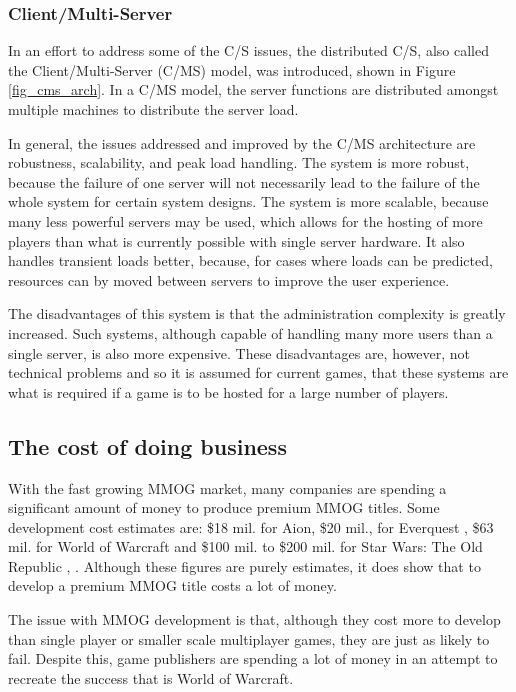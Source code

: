 \subsubsection{Client/Multi-Server}

In an effort to address some of the C/S issues, the distributed C/S, also called the Client/Multi-Server (C/MS) model, was introduced, shown in Figure \ref{fig_cms_arch}. In a C/MS model,
the server functions are distributed amongst multiple machines to distribute the server load.

In general, the issues addressed and improved by the C/MS architecture are robustness, scalability, and peak load handling. The system is more robust, because the failure of one server will not necessarily lead to the failure of the whole system for certain system designs. The system is more scalable, because many less powerful servers may be used, which allows for the hosting of more players than what is currently possible with single server hardware. It also handles transient loads better, because, for cases where loads can be predicted, resources can by moved between servers to improve the user experience.

The disadvantages of this system is that the administration complexity is greatly increased. Such systems, although capable of handling many more users than a single server, is also more expensive. These disadvantages are, however, not technical problems and so it is assumed for current games, that these systems are what is required if a game is to be hosted for a large number of players.

\subsection{The cost of doing business}
\label{mmog_cost}

With the fast growing MMOG market, many companies are spending a significant amount of money to produce premium MMOG titles. Some development cost estimates are: \$18 mil. for Aion, \$20 mil., for Everquest \cite{aion_everquest_cost}, \$63 mil. for World of Warcraft \cite{wow_cost} and \$100 mil. to \$200 mil. for Star Wars: The Old Republic \cite{star_wars_cost_1}, \cite{star_wars_cost_2}. Although these figures are purely estimates, it does show that to develop a premium MMOG title costs a lot of money.

The issue with MMOG development is that, although they cost more to develop than single player or smaller scale multiplayer games, they are just as likely to fail. Despite this, game publishers are spending a lot of money in an attempt to recreate the success that is World of Warcraft.

